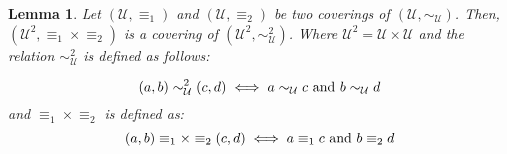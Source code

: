 \documentclass{article} %
\newtheorem{lem}{Lemma}
\begin{document}
\begin{lem}\label{lem:squaredCov} Let $(\mathcal{U},\equiv_1)$ and $(\mathcal{U},\equiv_2)$ be two coverings of $(\mathcal{U},\sim_\mathcal{U})$. Then,  $(\mathcal{U}^2,\equiv_1 \times \equiv_2)$ is a covering of $(\mathcal{U}^2,\sim^2_{\mathcal{U}})$. Where $\mathcal{U}^2 = \mathcal{U} \times \mathcal{U}$ and the relation $\sim^2_{\mathcal{U}}$ is defined as follows:

\begin{equation}
(a,b)\sim^2_{\mathcal{U}} (c,d) \iff a \sim_{\mathcal{U}} c \textnormal{ and } 
b \sim_{\mathcal{U}} d
\end{equation}
and $\equiv_1 \times \equiv_2$ is defined as:
\begin{equation}
(a,b)\equiv_1 \times \equiv_2 (c,d) \iff a \equiv_1 c \textnormal{ and } 
b \equiv_2 d
\end{equation}
\end{lem}

 
\end{document}
